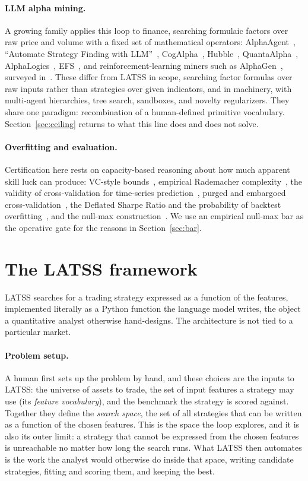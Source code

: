 \documentclass[11pt]{article}
\begin{document}
\paragraph{LLM alpha mining.} A growing family applies this loop to finance, searching formulaic
factors over raw price and volume with a fixed set of mathematical operators: AlphaAgent~\cite{alphaagent},
``Automate Strategy Finding with LLM''~\cite{automate}, CogAlpha~\cite{cogalpha},
Hubble~\cite{hubble}, QuantaAlpha~\cite{quantaalpha}, AlphaLogics~\cite{alphalogics},
EFS~\cite{efs}, and reinforcement-learning miners such as AlphaGen~\cite{alphagen}, surveyed
in~\cite{evolutionalpha}. These differ from LATSS in scope, searching factor formulas over raw
inputs rather than strategies over given indicators, and in machinery, with multi-agent hierarchies,
tree search, sandboxes, and novelty regularizers. They share one paradigm: recombination of a
human-defined primitive vocabulary. Section~\ref{sec:ceiling} returns to what this line does and does
not solve.

\paragraph{Overfitting and evaluation.} Certification here rests on capacity-based reasoning about
how much apparent skill luck can produce: VC-style bounds~\cite{vapnik}, empirical Rademacher
complexity~\cite{bartlett}, the validity of cross-validation for time-series
prediction~\cite{bergmeir}, purged and embargoed cross-validation~\cite{deprado}, the Deflated Sharpe
Ratio and the probability of backtest overfitting~\cite{deflated,pbo}, and the null-max
construction~\cite{nullmax}. We use an empirical null-max bar as the operative gate for the
reasons in Section~\ref{sec:bar}.

\section{The LATSS framework}
\label{sec:framework}

LATSS searches for a trading strategy expressed as a function of the features, implemented literally as a
Python function the language model writes, the object a quantitative analyst otherwise hand-designs. The
architecture is not tied to a particular market.

\paragraph{Problem setup.} A human first sets up the
problem by hand, and these choices are the inputs to LATSS: the universe of assets to trade, the set of
input features a strategy may use (its \emph{feature vocabulary}), and the benchmark the strategy is
scored against. Together they define the \emph{search space}, the set of all strategies that can be
written as a function of the chosen features. This is the space the loop explores, and it is also its
outer limit: a strategy that cannot be expressed from the chosen features is unreachable no matter how
long the search runs. What LATSS then automates is the work the analyst would otherwise do inside that
space, writing candidate strategies, fitting and scoring them, and keeping the best.
\end{document}
